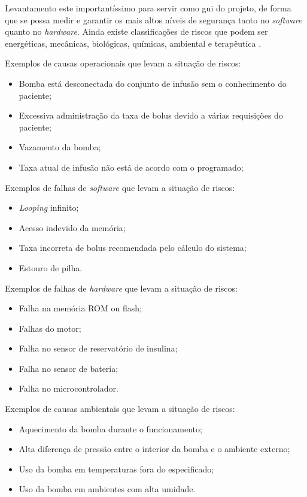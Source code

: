 Levantamento este importantíssimo para servir como gui do projeto, de forma que se possa medir e garantir os mais altos níveis de segurança tanto no \emph{software} quanto no \emph{hardware}. Ainda existe classificações de riscos que podem ser energéticas, mecânicas, biológicas, químicas, ambiental e terapêutica \cite{zhang2010hazard}. 

Exemplos de causas operacionais que levam a situação de riscos:
\begin{itemize}
\item Bomba está desconectada do conjunto de infusão sem o conhecimento do paciente;
\item Excessiva administração da taxa de bolus devido a várias requisições do paciente;
\item Vazamento da bomba;
\item Taxa atual de infusão não está de acordo com o programado;
\end{itemize}

Exemplos de falhas de \emph{software} que levam a situação de riscos:
\begin{itemize}
\item \emph{Looping} infinito;
\item Acesso indevido da memória;
\item Taxa incorreta de bolus recomendada pelo cálculo do sistema;	
\item Estouro de pilha.
\end{itemize}

Exemplos de falhas de \emph{hardware} que levam a situação de riscos:
\begin{itemize}
\item Falha na memória ROM ou flash;
\item Falhas do motor;
\item Falha no sensor de reservatório de insulina;	
\item Falha no sensor de bateria;
\item Falha no microcontrolador.
\end{itemize}

Exemplos de causas ambientais que levam a situação de riscos:
\begin{itemize}
\item Aquecimento da bomba durante o funcionamento;
\item Alta diferença de pressão entre o interior da bomba e o ambiente externo;
\item Uso da bomba em temperaturas fora do especificado;
\item Uso da bomba em ambientes com alta umidade.
\end{itemize}

